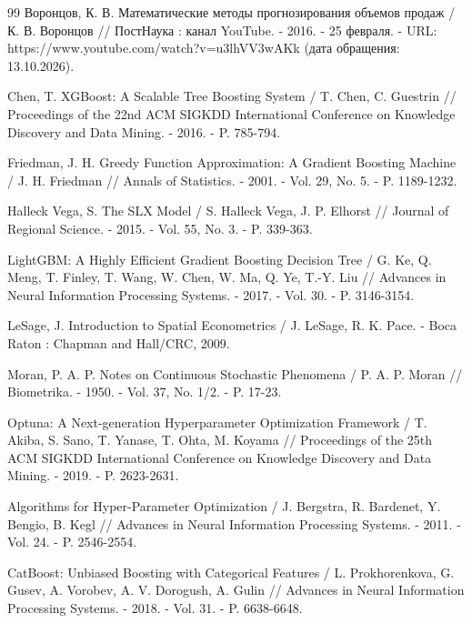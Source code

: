 \documentclass[12pt, a4paper]{article}
\begin{document}
\clearpage

\begin{thebibliography}{99}
    Воронцов, К. В. Математические методы прогнозирования объемов продаж / К. В. Воронцов // ПостНаука : канал YouTube. - 2016. - 25 февраля. - URL: https://www.youtube.com/watch?v=u3lhVV3wAKk (дата обращения: 13.10.2026).

    Chen, T. XGBoost: A Scalable Tree Boosting System / T. Chen, C. Guestrin // Proceedings of the 22nd ACM SIGKDD International Conference on Knowledge Discovery and Data Mining. - 2016. - P. 785-794.

    Friedman, J. H. Greedy Function Approximation: A Gradient Boosting Machine / J. H. Friedman // Annals of Statistics. - 2001. - Vol. 29, No. 5. - P. 1189-1232.

    Halleck Vega, S. The SLX Model / S. Halleck Vega, J. P. Elhorst // Journal of Regional Science. - 2015. - Vol. 55, No. 3. - P. 339-363.

    LightGBM: A Highly Efficient Gradient Boosting Decision Tree / G. Ke, Q. Meng, T. Finley, T. Wang, W. Chen, W. Ma, Q. Ye, T.-Y. Liu // Advances in Neural Information Processing Systems. - 2017. - Vol. 30. - P. 3146-3154.

    LeSage, J. Introduction to Spatial Econometrics / J. LeSage, R. K. Pace. - Boca Raton : Chapman and Hall/CRC, 2009.

    Moran, P. A. P. Notes on Continuous Stochastic Phenomena / P. A. P. Moran // Biometrika. - 1950. - Vol. 37, No. 1/2. - P. 17-23.

    Optuna: A Next-generation Hyperparameter Optimization Framework / T. Akiba, S. Sano, T. Yanase, T. Ohta, M. Koyama // Proceedings of the 25th ACM SIGKDD International Conference on Knowledge Discovery and Data Mining. - 2019. - P. 2623-2631.

    Algorithms for Hyper-Parameter Optimization / J. Bergstra, R. Bardenet, Y. Bengio, B. Kegl // Advances in Neural Information Processing Systems. - 2011. - Vol. 24. - P. 2546-2554.

    CatBoost: Unbiased Boosting with Categorical Features / L. Prokhorenkova, G. Gusev, A. Vorobev, A. V. Dorogush, A. Gulin // Advances in Neural Information Processing Systems. - 2018. - Vol. 31. - P. 6638-6648.
\end{thebibliography}
\end{document}
